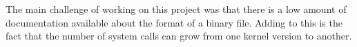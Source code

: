 The main challenge of working on this project was that there is a low amount
of documentation available about the format of a binary file. Adding to this
is the fact that the number of system calls can grow from one kernel version
to another.
